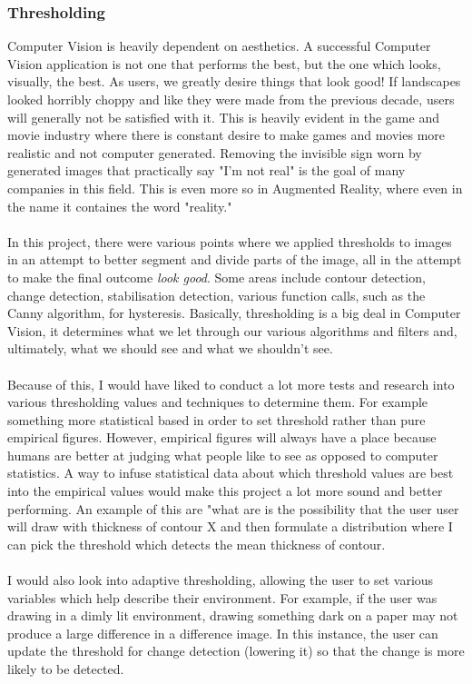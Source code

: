 \documentclass[11pt]{article}
\begin{document}
\subsubsection{Thresholding}
Computer Vision is heavily dependent on aesthetics. 
A successful Computer Vision application is not one 
that performs the best, but the one which looks, visually, 
the best. As users, we greatly desire things that look good! 
If landscapes looked horribly choppy and like they were made 
from the previous decade, users will generally not be 
satisfied with it. This is heavily evident in the game and 
movie industry where there is constant desire to make games
and movies more realistic and not computer generated. Removing 
the invisible sign worn by generated images that practically 
say "I'm not real" is the goal of many companies in this field. 
This is even more so in  Augmented Reality,
where even in the name it containes the word "reality." \\
\\
In this project, there were various points where we applied 
thresholds to images in an attempt to better segment and divide 
parts of the image, all in the attempt to make the final outcome
\textit{look good}. Some areas include contour detection, change
detection, stabilisation detection, various function calls, such as the
Canny algorithm, for hysteresis. Basically, thresholding is a big deal
in Computer Vision, it determines what we let through our various
algorithms and filters and, 
ultimately, what we should see and what we shouldn't see.\\
\\
Because of this, I would have liked to conduct a lot more 
tests and research into various thresholding values and techniques to 
determine them. For example something more statistical based in order
to set threshold rather than pure empirical figures. However, 
empirical figures will always have a place because humans are better
at judging what people like to see as opposed to computer statistics.
A way to infuse statistical data about which threshold values are
best into the empirical values would make this project a lot more
sound and better performing. An example of this are "what are is the 
possibility that the user user will draw with thickness of contour X
and then formulate a distribution where I can pick the threshold which
detects the mean thickness of contour. \\
\\
I would also look into adaptive thresholding, allowing the user to 
set various variables which help describe their environment. For example,
if the user was drawing in a dimly lit environment, drawing something
dark on a paper may not produce a large difference in a difference image.
In this instance, the user can update the threshold for change detection
(lowering it) so that the change is more likely to be detected.
\end{document}
